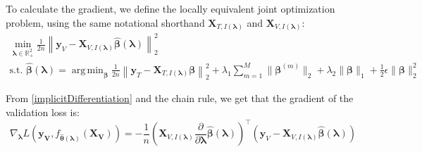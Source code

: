 \documentclass[12pt,letterpaper]{article}
\DeclareMathOperator*{\argmin}{arg\,min}
\begin{document}
To calculate the gradient, we define the locally equivalent joint optimization problem, using the same notational shorthand $\boldsymbol{X}_{T, I(\boldsymbol\lambda)}$ and $\boldsymbol{X}_{V, I(\boldsymbol\lambda)}$:
\begin{equation}
\begin{array}{c}
\min_{\boldsymbol{\lambda} \in \mathbb{R}^2_{+}} \frac{1}{2n} \left \| \boldsymbol{y}_V - \boldsymbol X_{V,I(\boldsymbol\lambda)} \hat{\boldsymbol\beta}(\boldsymbol{\lambda}) \right \|^2_2 \\
\text{s.t. }
\hat{\boldsymbol{\beta}}(\boldsymbol{\lambda}) = \argmin_{\boldsymbol \beta}
\frac{1}{2n} \left \| \boldsymbol{y}_T - \boldsymbol{X}_{T, I(\boldsymbol\lambda)} \boldsymbol \beta \right \|^2_2
+ \lambda_1 \sum_{m=1}^M \| \boldsymbol \beta^{(m)} \|_2
+ \lambda_2 \| \boldsymbol \beta \|_1
+ \frac{1}{2}\epsilon \| \boldsymbol \beta \|_2^2
\end{array}
\end{equation}


From \eqref{implicitDifferentiation} and the chain rule, we get that the gradient of the validation loss is:
\begin{equation}
\nabla_{\boldsymbol \lambda} L(\boldsymbol{y_V}, f_{\hat{\boldsymbol{\theta}}(\boldsymbol{\lambda})}(\boldsymbol{X_V})) =
- \frac{1}{n}
\left (
\boldsymbol{X}_{V, I(\boldsymbol\lambda)}
\frac{\partial}{\partial \boldsymbol\lambda} \hat{\boldsymbol{\beta}}(\boldsymbol{\lambda})
\right )^\top
\left (
\boldsymbol{y}_V - \boldsymbol{X}_{V, I(\boldsymbol\lambda)} \hat{\boldsymbol{\beta}}(\boldsymbol{\lambda})
\right )
\end{equation}
\end{document}
